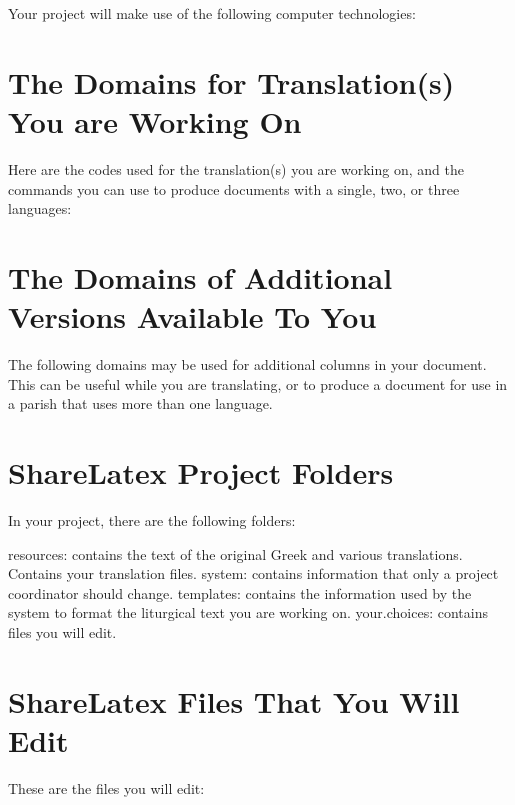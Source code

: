 \documentclass[]{memoir}
\begin{document}
Your project will make use of the following computer technologies:


\section{The Domains for Translation(s) You are Working On}

Here are the codes used for the translation(s) you are working on, and the commands you can use to produce documents with a single, two, or three languages:  


\section{The Domains of Additional Versions Available To You}

The following domains may be used for additional columns in your document.  This can be useful while you are translating, or to produce a document for use in a parish that uses more than one language.


\section{ShareLatex Project Folders}

In your project, there are the following folders:

\pex

\a resources: contains the text of the original Greek and various translations.  Contains your translation files.
\a system: contains information that only a project coordinator should change.
\a templates: contains the information used by the system to format the liturgical text you are working on.
\a your.choices: contains files you will edit.
\xe

\section{ShareLatex Files That You Will Edit}

These are the files you will edit:

\pex
\end{document}
